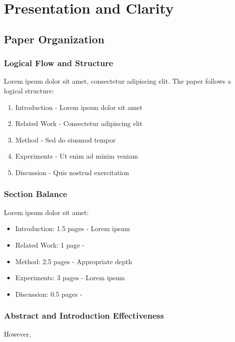 \section{Presentation and Clarity}
\label{sec:presentation_clarity}

\subsection{Paper Organization}
\subsubsection{Logical Flow and Structure}
Lorem ipsum dolor sit amet, consectetur adipiscing elit. The paper follows a logical structure:
\begin{enumerate}
    \item Introduction - Lorem ipsum dolor sit amet
    \item Related Work - Consectetur adipiscing elit
    \item Method - Sed do eiusmod tempor
    \item Experiments - Ut enim ad minim veniam
    \item Discussion - Quis nostrud exercitation
\end{enumerate}


\subsubsection{Section Balance}
Lorem ipsum dolor sit amet:
\begin{itemize}
    \item Introduction: 1.5 pages - Lorem ipsum
    \item Related Work: 1 page - 
    \item Method: 2.5 pages - Appropriate depth
    \item Experiments: 3 pages - Lorem ipsum
    \item Discussion: 0.5 pages - 
\end{itemize}

\subsubsection{Abstract and Introduction Effectiveness}
 However, 

